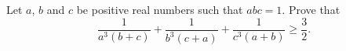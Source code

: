 Let $a$, $b$ and $c$ be positive real numbers such that $abc = 1$. Prove that
\[ \frac{1}{a^3(b+c)} + \frac{1}{b^3(c+a)} + \frac{1}{c^3(a+b)} \geq \frac{3}{2}. \]
